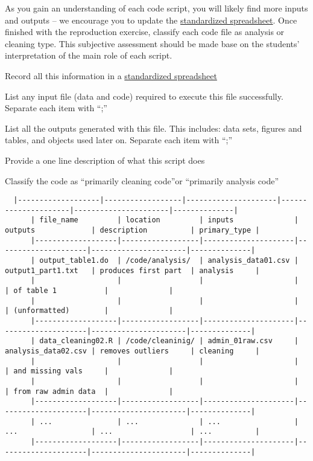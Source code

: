 \documentclass[]{book}
\begin{document}
As you gain an understanding of each code script, you will likely find more inputs and outputs -- we encourage you to update the \href{https://docs.google.com/spreadsheets/d/1LUIdVFH0OfR70C7z07TYeE-uWzKI_JIeWUMaYhqEKK0/edit\#gid=1617799822\&range=A1}{standardized spreadsheet}. Once finished with the reproduction exercise, classify each code file as analysis or cleaning type. This subjective assessment should be made base on the students' interpretation of the main role of each script.

Record all this information in a \href{https://docs.google.com/spreadsheets/d/1LUIdVFH0OfR70C7z07TYeE-uWzKI_JIeWUMaYhqEKK0/edit\#gid=1617799822\&range=A1}{standardized spreadsheet}

List any input file (data and code) required to execute this file successfully. Separate each item with ``;''

List all the outputs generated with this file. This includes: data sets, figures and tables, and objects used later on. Separate each item with ``;''

Provide a one line description of what this script does

Classify the code as ``primarily cleaning code''or ``primarily analysis code''

\begin{verbatim}
  |-------------------|------------------|---------------------|---------------------|----------------------|--------------|
      | file_name         | location         | inputs              | outputs             | description          | primary_type |
      |-------------------|------------------|---------------------|---------------------|----------------------|--------------|
      | output_table1.do  | /code/analysis/  | analysis_data01.csv | output1_part1.txt   | produces first part  | analysis     |
      |                   |                  |                     |                     | of table 1           |              |
      |                   |                  |                     |                     | (unformatted)        |              |
      |-------------------|------------------|---------------------|---------------------|----------------------|--------------|
      | data_cleaning02.R | /code/cleaninig/ | admin_01raw.csv     | analysis_data02.csv | removes outliers     | cleaning     |
      |                   |                  |                     |                     | and missing vals     |              |
      |                   |                  |                     |                     | from raw admin data  |              |
      |-------------------|------------------|---------------------|---------------------|----------------------|--------------|
      | ...               | ...              | ...                 | ...                 | ...                  | ...          |
      |-------------------|------------------|---------------------|---------------------|----------------------|--------------|
\end{verbatim}
\end{document}
